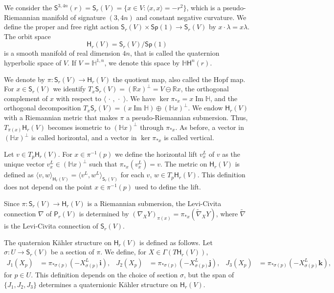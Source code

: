 \documentclass[12pt, a4paper,draft]{amsart}
\newcommand{\R}{\mathbb{R}}
\renewcommand{\H}{\mathbb{H}}
\renewcommand{\Im}{\operatorname{Im}}
\newcommand{\Sp}{\mathsf{Sp}}
\theoremstyle{remark}
\begin{document}
We consider the $\mathsf{S}^{3,4n}(r)=\mathsf{S}_r(V)=\{{x}\in V:\langle {x},{x}\rangle=-r^2\}$,
which is a pseudo-Riemannian manifold of signature $(3,4n)$ and constant negative curvature.
We define the proper and free right action $\mathsf{S}_r(V)\times\Sp(1)\to\mathsf{S}_r(V)$ by ${x}\cdot \lambda={x}\lambda$.
The orbit space 
\[
\mathsf{H}_r(V)=\mathsf{S}_r(V)/\Sp(1)
\]
is a smooth manifold of real dimension $4n$, that is called the quaternion hyperbolic space of $V$.
If $V=\H^{1,n}$, we denote this space by $\H \mathsf{H}^n(r)$.

We denote by $\pi\colon\mathsf{S}_r(V)\to\mathsf{H}_r(V)$ the quotient map, also called the Hopf map.
For ${x}\in\mathsf{S}_r(V)$ we identify $T_{x}\mathsf{S}_r(V)=(\R{x})^\perp=V\ominus\R{x}$, the orthogonal complement of ${x}$ with respect to $\langle\,\cdot\,,\,\cdot\,\,\rangle$.
We have $\ker\pi_{*{x}}={x}\Im\H$, and the orthogonal decomposition $T_{x}\mathsf{S}_r(V)=({x}\Im\H)\oplus(\H{x})^\perp$.
We endow $\mathsf{H}_r(V)$ with a Riemannian metric that makes $\pi$ a pseudo-Riemannian submersion.
Thus, $T_{\pi({x})}\mathsf{H}_r(V)$ becomes isometric to $(\H{x})^\perp$ through $\pi_{*{x}}$.
As before, a vector in $(\H x)^\perp$ is called horizontal, and a vector in $\ker\pi_{*x}$ is called vertical.

Let $v\in T_{p}\mathsf{H}_r(V)$.
For ${x}\in\pi^{-1}(p)$ we define the horizontal lift $v^L_{x}$ of $v$ as the unique vector $v_x^L\in(\H{x})^\perp$ such that $\pi_{*{x}}(v^L_{x})=v$.
The metric on $\mathsf{H}_r(V)$ is defined as 
$\langle v,w\rangle_{\mathsf{H}_r(V)}=\langle v^L,w^L\rangle_{\mathsf{S}_r(V)}$ 
for each $v$, $w\in T_p\mathsf{H}_r(V)$.
This definition does not depend on the point ${x}\in\pi^{-1}(p)$ used to define the lift.

Since $\pi\colon\mathsf{S}_r(V)\to\mathsf{H}_r(V)$ is a Riemannian submersion, the Levi-Civita connection $\nabla$ of $\mathsf{P}_r(V)$ is determined by
$(\nabla_X Y)_{\pi(x)}=\pi_{*x}(\tilde{\nabla}_X Y)$,
where $\tilde{\nabla}$ is the Levi-Civita connection of $\mathsf{S}_r(V)$.

The quaternion K\"ahler structure on $\mathsf{H}_r(V)$ is defined as follows.
Let $\sigma\colon U\to\mathsf{S}_r(V)$ be a section of $\pi$.
We define, for $X\in\Gamma(T\mathsf{H}_r(V))$,
\[
\begin{aligned}
J_1(X_p)&{}=\pi_{*\sigma(p)}(-X_{\sigma(p)}^L\mathbf{i}),
&J_2(X_p)&{}=\pi_{*\sigma(p)}(-X_{\sigma(p)}^L\mathbf{j}),
&J_3(X_p)&{}=\pi_{*\sigma(p)}(-X_{\sigma(p)}^L\mathbf{k}),
\end{aligned}
\]
for $p\in U$.
This definition depends on the choice of section $\sigma$, but the span of $\{J_1,J_2,J_3\}$ determines a quaternionic K\"ahler structure on $\mathsf{H}_r(V)$.
\end{document}
